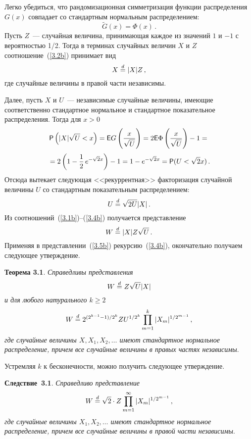 \begin{multicols}{2}
Легко убедиться, что рандомизационная сим\-мет\-ри\-за\-ция функции
распределения $G(x)$ совпадает со стандартным нормальным
распределением:
\begin{equation}
\widetilde G(x)=\Phi(x)\,.\label{3.2b}
\end{equation}
Пусть $Z$~--- случайная величина, принимающая каж\-дое из значений
$1$ и $-1$ с вероятностью 1/2. Тогда в терминах случайных
величин $X$ и $Z$ соотношение~(\ref{3.2b}) принимает вид
\begin{equation}
X\stackrel{d}{=} |X| Z\,,\label{3.3b}
\end{equation}
где случайные величины в правой части незави\-симы.

Далее, пусть $X$ и $U$~--- независимые случайные величины, имеющие
соответственно стандартное нормальное и стандартное показательное
распределения. Тогда для $x>0$
$$
{\sf P}\left (|X|\sqrt{U}<x\right )={\sf E}G\left (
\displaystyle\frac{\displaystyle x\mathstrut}{\displaystyle \sqrt{U}\mathstrut}\right )=
2{\sf E}\Phi\left (\displaystyle\frac{\displaystyle x\mathstrut}{\displaystyle \sqrt{U}\mathstrut}\right )-1={}
$$
$$
{}=2\left (1-\displaystyle\frac{\displaystyle 1\mathstrut}{\displaystyle 2\mathstrut}\,e^{-\sqrt{2}x}\right )-1=
1-e^{-\sqrt{2}x}={\sf P}(U<\sqrt{2}x)\,.
$$ %
Отсюда вытекает следующая <<рекуррентная>> факторизация случайной
величины $U$ со стандартным показательным распределением:
\begin{equation}
U\stackrel{d}{=}\sqrt{2U} |X|\,.\label{3.4b}
\end{equation}
Из соотношений~(\ref{3.1b})--(\ref{3.4b}) получается представление
\begin{equation}
W\stackrel{d}{=} |X| Z \sqrt{U}\,.\label{3.5b}
\end{equation}
Применяя в представлении~(\ref{3.5b})
рекурсию~(\ref{3.4b}), окончательно получаем следующее утверждение.

\medskip

\noindent
{\bf Теорема 3.1}. {\it Справедливы представления
$$
W\stackrel{d}{=} Z\sqrt{U} |X|
$$
и для любого натурального $k\ge2$
$$
W\stackrel{d}{=} 2^{(2^{k-1}-1)/2^k} Z U^{1/2^k}
\prod_{m=1}^{k}|X_m|^{1/2^{m-1}}\,,
$$
где случайные величины
$X,X_1,X_2,\ldots$ имеют стандартное нормальное распределение,
причем все случайные величины в правых частях независимы}.

\smallskip

Устремляя $k$ к бесконечности, можно получить следующее утверждение.

\medskip

\noindent
{\bf Следствие~3.1}. {\it Справедливо представление
$$
W\stackrel{d}{=} \sqrt{2}\cdot Z \prod_{m=1}^{\infty}|X_m|^{1/2^{m-1}}\,,
$$
где случайные величины $X_1,X_2,\ldots$ имеют стандартное нормальное
распределение, причем все случайные величины в правой части
независимы}.


\end{multicols}
